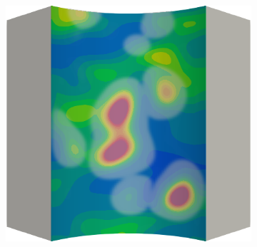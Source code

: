 \begin{figure}[!htbp]
\begin{subfigure}{0.19\textwidth}
  \end{subfigure}
  \hspace{0.06\textwidth}
  \begin{subfigure}{0.19\textwidth}
    \centering
    \includegraphics[width=\textwidth]{Chapter5/figures/spallation/ep.0021}
  \end{subfigure}
  

\end{figure}
